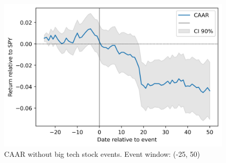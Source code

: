 \begin{figure}[h]
  \centering
  \includegraphics[width=1\textwidth]{figures/esnoBigCapLong.png}
  \caption{CAAR without big tech stock events. Event window: (-25, 50)}
  \label{fig:esnoBigCapLong}
\end{figure}






